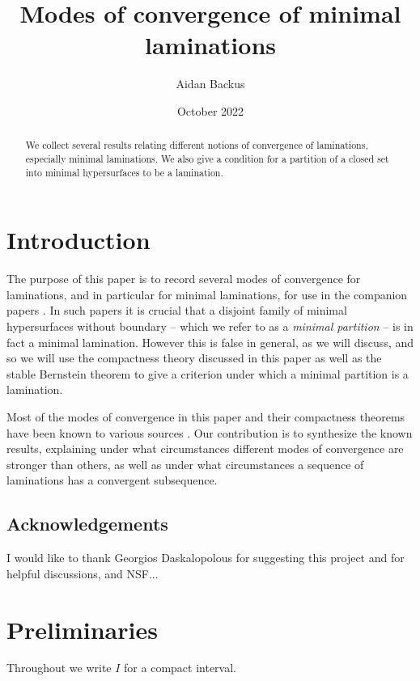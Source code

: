 \documentclass[reqno,10pt]{amsart}
\title{Modes of convergence of minimal laminations}
\author{Aidan Backus}
\date{October 2022}
\newcommand{\dfn}[1]{\emph{#1}\index{#1}}
\theoremstyle{definition}
\numberwithin{equation}{section}
\begin{document}
\begin{abstract}
We collect several results relating different notions of convergence of laminations, especially minimal laminations.
We also give a condition for a partition of a closed set into minimal hypersurfaces to be a lamination.
\end{abstract}

\maketitle



\section{Introduction}
The purpose of this paper is to record several modes of convergence for laminations, and in particular for minimal laminations, for use in the companion papers \cite{BackusFLG, DaskalopoulosPrep2}.
In such papers it is crucial that a disjoint family of minimal hypersurfaces without boundary -- which we refer to as a \dfn{minimal partition} -- is in fact a minimal lamination.
However this is false in general, as we will discuss, and so we will use the compactness theory discussed in this paper as well as the stable Bernstein theorem \cite{Schoen2016, Chodosh2021} to give a criterion under which a minimal partition is a lamination.

Most of the modes of convergence in this paper and their compactness theorems have been known to various sources \cite{ColdingMinicozziIV, ColdingMinicozziV, thurston1979geometry}.
Our contribution is to synthesize the known results, explaining under what circumstances different modes of convergence are stronger than others, as well as under what circumstances a sequence of laminations has a convergent subsequence.


\subsection{Acknowledgements}
I would like to thank Georgios Daskalopolous for suggesting this project and for helpful discussions, and NSF...


\section{Preliminaries}
Throughout we write $I$ for a compact interval.
\end{document}
